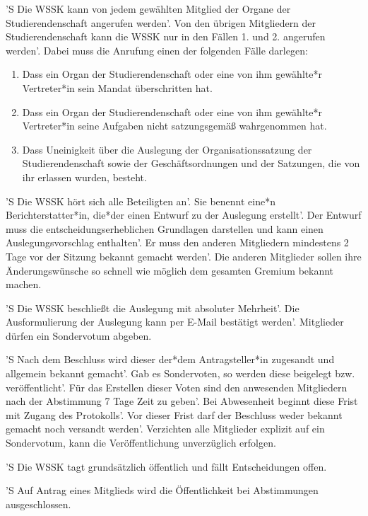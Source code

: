 \documentclass[fontsize=12pt,parskip=half]{scrartcl}
\begin{document}
\begin{contract}
  'S Die WSSK kann von jedem gewählten Mitglied der Organe der
  Studierendenschaft angerufen werden'. Von den übrigen Mitgliedern der
  Studierendenschaft kann die WSSK nur in den Fällen 1. und 2. angerufen
  werden'. Dabei muss die Anrufung einen der folgenden Fälle darlegen:
  \begin{enumerate}
    \item Dass ein Organ der Studierendenschaft oder eine von ihm gewählte*r
      Vertreter*in sein Mandat überschritten hat.
    \item Dass ein Organ der Studierendenschaft oder eine von ihm gewählte*r
      Vertreter*in seine Aufgaben nicht satzungsgemäß wahrgenommen hat.
    \item Dass Uneinigkeit über die Auslegung der Organisationssatzung der
      Studierendenschaft sowie der Geschäftsordnungen und der Satzungen, die von
      ihr erlassen wurden, besteht.
  \end{enumerate}

  'S Die WSSK hört sich alle Beteiligten an'. Sie benennt eine*n
  Berichterstatter*in‚ die*der einen Entwurf zu der Auslegung erstellt'. Der
  Entwurf muss die entscheidungserheblichen Grundlagen darstellen und kann einen
  Auslegungsvorschlag enthalten'. Er muss den anderen Mitgliedern mindestens 2
  Tage vor der Sitzung bekannt gemacht werden'. Die anderen Mitglieder sollen
  ihre Änderungswünsche so schnell wie möglich dem gesamten Gremium bekannt
  machen.

  'S Die WSSK beschließt die Auslegung mit absoluter Mehrheit'. Die
  Ausformulierung der Auslegung kann per E-Mail bestätigt werden'. Mitglieder
  dürfen ein Sondervotum abgeben.

  'S Nach dem Beschluss wird dieser der*dem Antragsteller*in zugesandt und
  allgemein bekannt gemacht'. Gab es Sondervoten, so werden diese beigelegt bzw.
  veröffentlicht'. Für das Erstellen dieser Voten sind den anwesenden
  Mitgliedern nach der Abstimmung 7 Tage Zeit zu geben'. Bei Abwesenheit beginnt
  diese Frist mit Zugang des Protokolls'. Vor dieser Frist darf der Beschluss
  weder bekannt gemacht noch versandt werden'. Verzichten alle Mitglieder
  explizit auf ein Sondervotum, kann die Veröffentlichung unverzüglich erfolgen.

  'S  Die WSSK tagt grundsätzlich öffentlich und fällt Entscheidungen offen.

  'S Auf Antrag eines Mitglieds wird die Öffentlichkeit bei Abstimmungen
  ausgeschlossen.


\end{contract}
\end{document}
